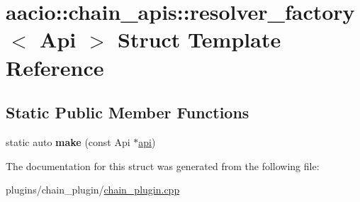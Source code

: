\hypertarget{structaacio_1_1chain__apis_1_1resolver__factory}{}\section{aacio\+:\+:chain\+\_\+apis\+:\+:resolver\+\_\+factory$<$ Api $>$ Struct Template Reference}
\label{structaacio_1_1chain__apis_1_1resolver__factory}
\subsection*{Static Public Member Functions}
\begin{DoxyCompactItemize}
\item 
\mbox{\label{structaacio_1_1chain__apis_1_1resolver__factory_a5448308f413f3314122592e036b5c5e8}} 
static auto {\bfseries make} (const Api $\ast$\mbox{\hyperlink{classfc_1_1api}{api}})
\end{DoxyCompactItemize}


The documentation for this struct was generated from the following file\+:\begin{DoxyCompactItemize}
\item 
plugins/chain\+\_\+plugin/\mbox{\hyperlink{chain__plugin_8cpp}{chain\+\_\+plugin.\+cpp}}\end{DoxyCompactItemize}
